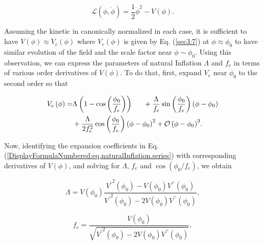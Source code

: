 \documentclass[12pt]{article}
\begin{document}
\begin{equation}
  \mathcal{L}\left(\phi,\dot{\phi}\right)=\frac{1}{2}{\dot{\phi}}^2-V\left(\phi \right).
\end{equation}

Assuming the kinetic in canonically normalized in each case, it is sufficient to have $V\left(\phi \right)\approx V_{e}\left(\phi \right)$
where $V_{e}\left(\phi \right)$ is given by Eq. (\ref{sec3:7})
at $\phi \approx \phi_0$ to have similar evolution of the field and the scale factor near $\phi\sim \phi_0$. Using this observation, we can express the parameters of natural Inflation $\Lambda$ and $f_e$ in terms of various order derivatives of $V\left(\phi \right)$. To do that, first, expand $V_{e}$ near $\phi_0$ to the second order so that

\begin{equation}\label{DisplayFormulaNumbered:eq.naturalInflation.series}
  \begin{split}
    V_{e}\left(\phi \right)=&\Lambda \left(1-\cos\left(\frac{\phi_0}{f_e}\right)\right)
    \indent{}+\frac{\Lambda}{f_e}\sin\left(\frac{\phi_0}{f_e}\right)\left(\phi -\phi_0\right)\\
    &+\frac{\Lambda}{2f_e^2}\cos\left(\frac{\phi_0}{f_e}\right){\left(\phi -\phi_0\right)}^2+{\mathcal{O}\left(\phi -\phi_0\right)}^3.
  \end{split}
\end{equation}

Now, identifying the expansion coefficients in Eq.(\ref{DisplayFormulaNumbered:eq.naturalInflation.series}) with corresponding derivatives of $V\left(\phi \right)$, and solving for $\Lambda$, $f_e$ and $\cos\left(\phi_0/f_e\right)$, we obtain

\begin{equation}\label{DisplayFormulaNumbered:eq.lambda.potential}
  \Lambda =V\left(\phi_0\right)\frac{{V^\prime}^2\left(\phi_0\right)-V\left(\phi_0\right)V^{\prime\prime} \left(\phi_0\right)}{{V^\prime}^2\left(\phi_0\right)-2V\left(\phi_0\right)V^{\prime\prime} \left(\phi_0\right)},
\end{equation}

\begin{equation}\label{DisplayFormulaNumbered:eq.fe.potential}
  f_e=\frac{V\left(\phi_0\right)}{\sqrt{{V^\prime}^2\left(\phi_0\right)-2V\left(\phi_0\right)V^{\prime\prime} \left(\phi_0\right)}},
\end{equation}
\end{document}
